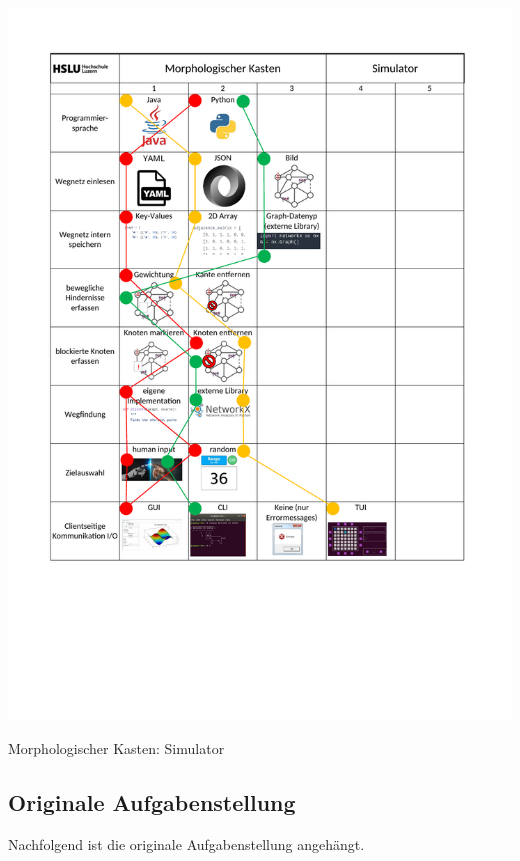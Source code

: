 \begin{table}
\centering
\includegraphics[width=\textwidth]{assets/MK_Simulator.pdf}
\caption{Morphologischer Kasten: Simulator}
\label{table:MK-Simulator}
\end{table}
\newpage


\subsection{Originale Aufgabenstellung}\label{aufgabenstellung}

Nachfolgend ist die originale Aufgabenstellung angehängt.


